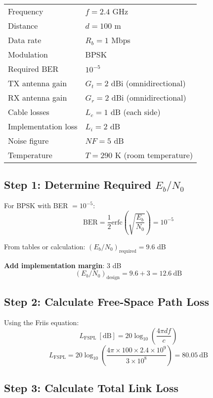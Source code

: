 \begin{tabular}{@{}ll@{}}
Frequency & $f = 2.4$ GHz \\
Distance & $d = 100$ m \\
Data rate & $R_b = 1$ Mbps \\
Modulation & BPSK \\
Required BER & $10^{-5}$ \\
TX antenna gain & $G_t = 2$ dBi (omnidirectional) \\
RX antenna gain & $G_r = 2$ dBi (omnidirectional) \\
Cable losses & $L_c = 1$ dB (each side) \\
Implementation loss & $L_i = 2$ dB \\
Noise figure & $NF = 5$ dB \\
Temperature & $T = 290$ K (room temperature) \\
\end{tabular}

\subsection*{Step 1: Determine Required $E_b/N_0$}

For BPSK with BER $= 10^{-5}$:
\begin{equation}
\text{BER} = \frac{1}{2}\text{erfc}\left(\sqrt{\frac{E_b}{N_0}}\right) = 10^{-5}
\end{equation}

From tables or calculation: $(E_b/N_0)_{\text{required}} = 9.6$ dB

\textbf{Add implementation margin}: $3$ dB
\[
(E_b/N_0)_{\text{design}} = 9.6 + 3 = 12.6\ \text{dB}
\]

\subsection*{Step 2: Calculate Free-Space Path Loss}

Using the Friis equation:
\begin{equation}
L_{\text{FSPL}}\ [\text{dB}] = 20\log_{10}\left(\frac{4\pi d f}{c}\right)
\end{equation}
\begin{equation}
L_{\text{FSPL}} = 20\log_{10}\left(\frac{4\pi \times 100 \times 2.4 \times 10^9}{3 \times 10^8}\right) = 80.05\ \text{dB}
\end{equation}

\subsection*{Step 3: Calculate Total Link Loss}

